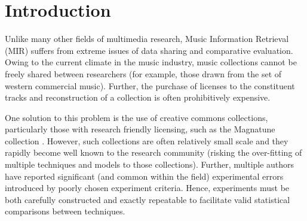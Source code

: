 \documentclass[conference]{IEEEtran}
\begin{document}
%





\section{Introduction}
Unlike many other fields of multimedia research, Music Information Retrieval (MIR) suffers from extreme issues of data sharing and comparative evaluation. Owing to the current climate in the music industry, music collections cannot be freely shared between researchers (for example, those drawn from the set of western commercial music). Further, the purchase of licenses to the constituent tracks and reconstruction of a collection is often prohibitively expensive. 

One solution to this problem is the use of creative commons collections, particularly those with research friendly licensing, such as the Magnatune collection \cite{magnatune}. However, such collections are often relatively small scale and they rapidly become well known to the research community (risking the over-fitting of multiple techniques and models to those collections). Further, multiple authors \cite{albumeffect,pampalk:thesis} have reported significant (and common within the field) experimental errors introduced by poorly chosen experiment criteria. Hence, experiments must be both carefully constructed and exactly repeatable to facilitate valid statistical comparisons between techniques.
\end{document}
